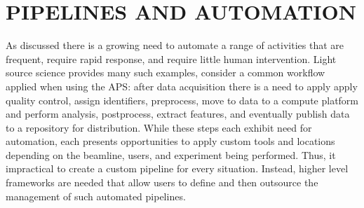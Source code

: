 \documentclass{aip-cp}
\newcommand\ryan[1]{}
\newcommand\ryan[1]{{\color{green}[Ryan: #1]}}
\begin{document}
\section{PIPELINES AND AUTOMATION}
\ryan{Making this an automation section. }

As discussed there is a growing need to automate a range
of activities that are frequent, require rapid response, 
and require little human intervention. Light source 
science provides many such examples, consider a common
workflow applied when using the APS:  after data acquisition
there is a need to apply apply quality control, assign identifiers, 
preprocess, move to data to a compute platform and perform analysis, postprocess, extract 
features, and eventually publish data to a repository for distribution. 
While these steps each exhibit need for automation, each
presents opportunities to apply custom tools and locations depending on the beamline, users, and 
experiment being performed. Thus, it impractical to create a custom pipeline for every 
situation. Instead, higher level frameworks are needed that allow users to define
and then outsource the management of such automated pipelines. 

\end{document}
